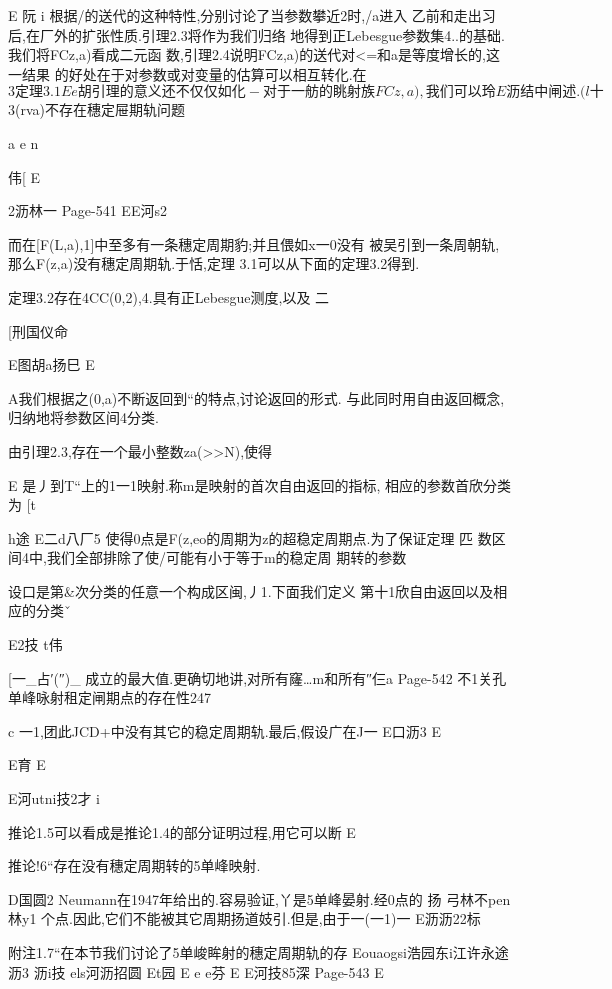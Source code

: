 {{E
阮
i
根据/的送代的这种特性,分别讨论了当参数攀近2时,/a进入
乙前和走出习后,在厂外的扩张性质.引理2.3将作为我们归络
地得到正Lebesgue参数集4..的基础.我们将FCz,a)看成二元函
数,引理2.4说明FCz,a)的送代对<=和a是等度增长的,这一结果
的好处在于对参数或对变量的估算可以相互转化.在$3定理3.1
Ee胡
引理的意义还不仅仅如化-对于一舫的眺射族FCz,a),我们可以
玲
E沥
结中闸述.

(l十

$3(rva)不存在穗定屉期轨问题

a
e
n

伟[
E

2沥林一
Page-541
EE河s2

而在[F(L,a),1]中至多有一条穗定周期豹;并且偎如x一0没有
被吴引到一条周朝轨,那么F(z,a)没有穗定周期轨.于恬,定理
3.1可以从下面的定理3.2得到.

定理3.2存在4CC(0,2),4.具有正Lebesgue测度,以及
二

[刑国仪命

E图胡a扬巳
E

A我们根据之(0,a)不断返回到“的特点,讨论返回的形式.
与此同时用自由返回概念,归纳地将参数区间4分类.

由引理2.3,存在一个最小整数za(>>N),使得

E
是丿到T“上的1一1映射.称m是映射的首次自由返回的指标,
相应的参数首欣分类为
[t

h途
E二d八厂5
使得0点是F(z,eo的周期为z的超稳定周期点.为了保证定理
匹
数区间4中,我们全部排除了使/可能有小于等于m的稳定周
期转的参数

设口是第&次分类的任意一个构成区闽,丿1.下面我们定义
第十1欣自由返回以及相应的分类ˇ

E2技
t伟

[一_占′(″)_
成立的最大值.更确切地讲,对所有窿…m和所有″仨a
Page-542
不1关孔单峰咏射租定闸期点的存在性247

c
一1,团此JCD+中没有其它的稳定周期轨.最后,假设广在J一
E口沥3
E

E育
E

E河utni技2才
i

推论1.5可以看成是推论1.4的部分证明过程,用它可以断
E

推论!6“存在没有穗定周期转的5单峰映射.

D国圆2
Neumann在1947年给出的.容易验证,丫是5单峰晏射.经0点的
扬
弓林不pen林y1
个点.因此,它们不能被其它周期扬道妓引.但是,由于一(一1)一
E沥沥22标

附注1.7“在本节我们讨论了5单峻眸射的穗定周期轨的存
Eouaogsi浩园东i江许永途沥3
沥i技
els河沥招圆
Et园
E
e
e芬
E
E河技85深
Page-543
E

}}
